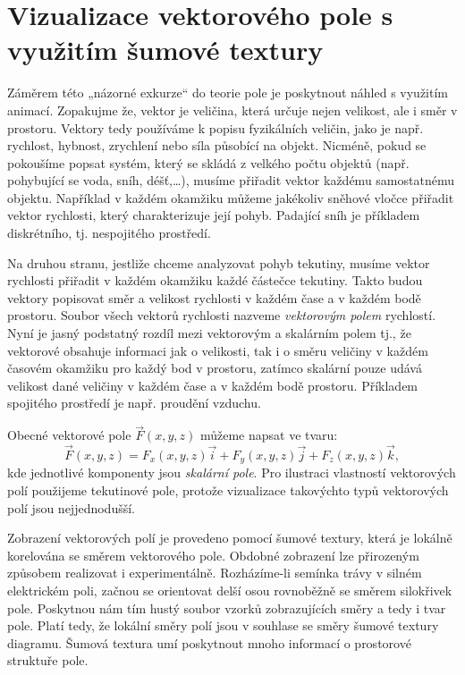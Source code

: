   \section{Vizualizace vektorového pole s využitím šumové textury}
    Záměrem této „názorné exkurze“ do teorie pole je poskytnout náhled s využitím animací. Zopakujme 
    že, vektor je veličina, která určuje nejen velikost, ale i směr v prostoru. Vektory tedy 
    používáme k popisu fyzikálních veličin, jako je např. rychlost, hybnost, zrychlení nebo síla 
    působící na objekt. Nicméně, pokud se pokoušíme popsat systém, který se skládá z velkého počtu 
    objektů (např. pohybující se voda, sníh, déšť,…), musíme přiřadit vektor každému samostatnému 
    objektu. Například v každém okamžiku můžeme jakékoliv sněhové vločce přiřadit vektor rychlosti, 
    který charakterizuje její pohyb. Padající sníh je příkladem diskrétního, tj. nespojitého 
    prostředí.    
    
    Na druhou stranu, jestliže chceme analyzovat pohyb tekutiny, musíme vektor rychlosti přiřadit v 
    každém okamžiku každé částečce tekutiny. Takto budou vektory popisovat směr a velikost rychlosti 
    v každém čase a v každém bodě prostoru. Soubor všech vektorů rychlosti nazveme \emph{vektorovým 
    polem} rychlostí. Nyní je jasný podstatný rozdíl mezi vektorovým a skalárním polem tj., že 
    vektorové obsahuje informaci jak o velikosti, tak i o směru veličiny v každém časovém okamžiku 
    pro každý bod v prostoru, zatímco skalární pouze udává velikost dané veličiny v každém čase a v 
    každém bodě prostoru. Příkladem spojitého prostředí je např. proudění vzduchu.
    
    Obecné vektorové pole \(\vec{F}(x, y, z)\) můžeme napsat ve tvaru:
    \begin{equation}
     \vec{F}(x,y,z) = F_x(x,y,z)\vec{i} + F_y(x,y,z)\vec{j} + F_z(x,y,z)\vec{k},
    \end{equation} 
    kde jednotlivé komponenty jsou \emph{skalární pole}. Pro ilustraci vlastností vektorových polí   
    použijeme tekutinové pole, protože vizualizace takovýchto typů vektorových polí jsou 
    nejjednodušší.  
    
    Zobrazení vektorových polí je provedeno pomocí šumové textury, která je lokálně korelována se 
    směrem vektorového pole. Obdobné zobrazení lze přirozeným způsobem realizovat i experimentálně. 
    Rozházíme-li semínka trávy v silném elektrickém poli, začnou se orientovat delší osou rovnoběžně 
    se směrem silokřivek pole. Poskytnou nám tím hustý soubor vzorků zobrazujících směry a tedy i 
    tvar pole. Platí tedy, že lokální směry polí jsou v souhlase se směry šumové textury diagramu. 
    Šumová textura umí poskytnout mnoho informací o prostorové struktuře pole.
      
